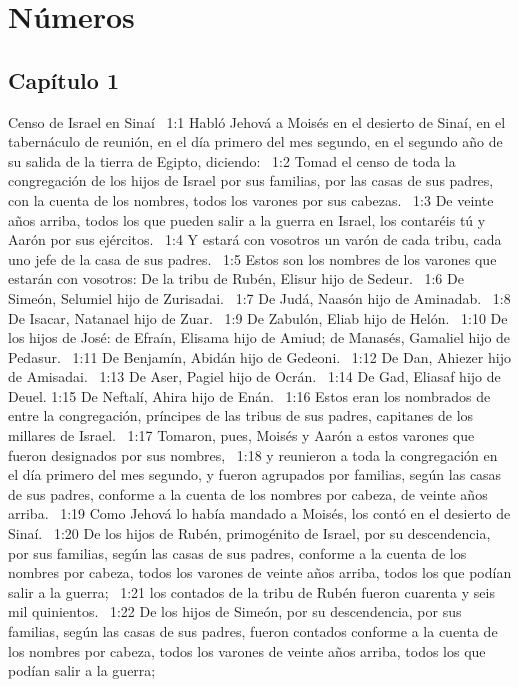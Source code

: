 
\chapter{Números}

\section*{Capítulo 1}

Censo de Israel en Sinaí  
1:1 Habló Jehová a Moisés en el desierto de Sinaí, en el tabernáculo de reunión, en el día primero del mes segundo, en el segundo año de su salida de la tierra de Egipto, diciendo:  
1:2 Tomad el censo de toda la congregación de los hijos de Israel por sus familias, por las casas de sus padres, con la cuenta de los nombres, todos los varones por sus cabezas.  
1:3 De veinte años arriba, todos los que pueden salir a la guerra en Israel, los contaréis tú y Aarón por sus ejércitos.  
1:4 Y estará con vosotros un varón de cada tribu, cada uno jefe de la casa de sus padres.  
1:5 Estos son los nombres de los varones que estarán con vosotros: De la tribu de Rubén, Elisur hijo de Sedeur.  
1:6 De Simeón, Selumiel hijo de Zurisadai.  
1:7 De Judá, Naasón hijo de Aminadab.  
1:8 De Isacar, Natanael hijo de Zuar.  
1:9 De Zabulón, Eliab hijo de Helón.  
1:10 De los hijos de José: de Efraín, Elisama hijo de Amiud; de Manasés, Gamaliel hijo de Pedasur.  
1:11 De Benjamín, Abidán hijo de Gedeoni.  
1:12 De Dan, Ahiezer hijo de Amisadai.  
1:13 De Aser, Pagiel hijo de Ocrán.  
1:14 De Gad, Eliasaf hijo de Deuel. 
1:15 De Neftalí, Ahira hijo de Enán.  
1:16 Estos eran los nombrados de entre la congregación, príncipes de las tribus de sus padres, capitanes de los millares de Israel.  
1:17 Tomaron, pues, Moisés y Aarón a estos varones que fueron designados por sus nombres,  
1:18 y reunieron a toda la congregación en el día primero del mes segundo, y fueron agrupados por familias, según las casas de sus padres, conforme a la cuenta de los nombres por cabeza, de veinte años arriba.  
1:19 Como Jehová lo había mandado a Moisés, los contó en el desierto de Sinaí.  
1:20 De los hijos de Rubén, primogénito de Israel, por su descendencia, por sus familias, según las casas de sus padres, conforme a la cuenta de los nombres por cabeza, todos los varones de veinte años arriba, todos los que podían salir a la guerra;  
1:21 los contados de la tribu de Rubén fueron cuarenta y seis mil quinientos.  
1:22 De los hijos de Simeón, por su descendencia, por sus familias, según las casas de sus padres, fueron contados conforme a la cuenta de los nombres por cabeza, todos los varones de veinte años arriba, todos los que podían salir a la guerra;  
